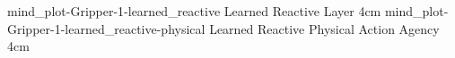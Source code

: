 {{\experimentcausegroupplots{\dataappendixmaxtime}
                           {\dataappendixexperimentonemaxtime}
                           {\dataappendixexperimenttwomaxtime}
                           {\dataappendixexperimentthreemaxtime}
                           {\dataappendixexperimentonename}
                           {\dataappendixexperimenttwoname}
                           {\dataappendixexperimentthreename}
                           {\dataappendixexperimentoneprettyname}
                           {\dataappendixexperimenttwoprettyname}
                           \experimentcausegroupplotscontinued{\dataappendixexperimentthreeprettyname}
                                                              {mind_plot-Gripper-1-learned_reactive}
                                                              {Learned Reactive Layer}
                                                              {\experimentdatacommontablereference}
                                                              {4cm}}
{\experimentcausegroupplots{\dataappendixmaxtime}
                           {\dataappendixexperimentonemaxtime}
                           {\dataappendixexperimenttwomaxtime}
                           {\dataappendixexperimentthreemaxtime}
                           {\dataappendixexperimentonename}
                           {\dataappendixexperimenttwoname}
                           {\dataappendixexperimentthreename}
                           {\dataappendixexperimentoneprettyname}
                           {\dataappendixexperimenttwoprettyname}
                           \experimentcausegroupplotscontinued{\dataappendixexperimentthreeprettyname}
                                                              {mind_plot-Gripper-1-learned_reactive-physical}
                                                              {Learned Reactive Physical Action Agency}
                                                              {\experimentdatacommontablereference}
                                                              {4cm}}
{\experimentcausegroupplots{\dataappendixmaxtime}
                           {\dataappendixexperimentonemaxtime}
                           {\dataappendixexperimenttwomaxtime}
                           {\dataappendixexperimentthreemaxtime}
                           {\dataappendixexperimentonename}
                           {\dataappendixexperimenttwoname}
                           {\dataappendixexperimentthreename}
                           {\dataappendixexperimentoneprettyname}
}}
